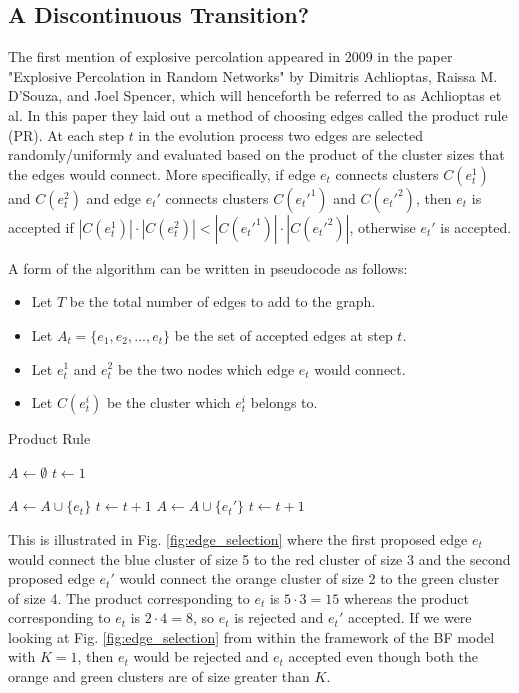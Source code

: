 \subsection{A Discontinuous Transition?}
The first mention of explosive percolation appeared in 2009 in the paper "Explosive Percolation in Random Networks" \cite{Achlioptas_1} by Dimitris Achlioptas, Raissa M. D’Souza, and Joel Spencer, which will henceforth be referred to as Achlioptas et al.
In this paper they laid out a method of choosing edges called the product rule (PR).
At each step $t$ in the evolution process two edges are selected randomly/uniformly and evaluated based on the product of the cluster sizes that the edges would connect.
More specifically, if edge $e_t$ connects clusters $C(e_t^1)$ and $C(e_t^2)$ and edge $e_t'$ connects clusters $C(e_t'^1)$ and $C(e_t'^2)$, then $e_t$ is accepted if $|C(e_t^1)| \cdot |C(e_t^2)| < |C(e_t'^1)| \cdot |C(e_t'^2)|$, otherwise $e_t'$ is accepted.

A form of the algorithm can be written in pseudocode as follows:
\begin{itemize}
	\item Let $T$ be the total number of edges to add to the graph.
	\item Let $A_t = \{e_1, e_2, ..., e_t\}$ be the set of accepted edges at step $t$.
	\item Let $e_t^1$ and $e_t^2$ be the two nodes which edge $e_t$ would connect.
	\item Let $C(e_t^i)$ be the cluster which $e_t^i$ belongs to.
\end{itemize}

\begin{algorithm}
	\caption{Product Rule}\label{Product-Rule}
	\begin{algorithmic}[1]
		\State $A \gets \emptyset$
		\State $t \gets 1$

				\State $A \gets A \cup \{e_t\}$
				\State $t \gets t+1$
			\Else
				\State $A \gets A \cup \{e_t'\}$
				\State $t \gets t+1$
			\EndIf
		\EndWhile
	\EndProcedure
	\end{algorithmic}
\end{algorithm}

This is illustrated in Fig. \ref{fig:edge_selection} where the first proposed edge $e_t$ would connect the blue cluster of size 5 to the red cluster of size 3 and the second proposed edge $e_t'$ would connect the orange cluster of size 2 to the green cluster of size 4.
The product corresponding to $e_t$ is $5 \cdot 3 = 15$ whereas the product corresponding to $e_t$ is $2 \cdot 4 = 8$, so $e_t$ is rejected and $e_t'$ accepted.
If we were looking at Fig. \ref{fig:edge_selection} from within the framework of the BF model with $K = 1$, then $e_t$ would be rejected and $e_t$ accepted even though both the orange and green clusters are of size greater than $K$.

